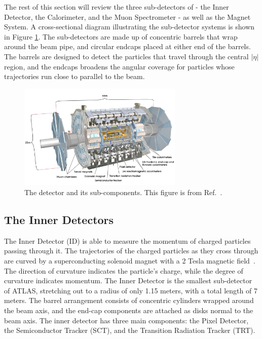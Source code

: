 The rest of this section will review the three sub-detectors of \ATLAS - the Inner Detector, the Calorimeter, and the Muon Spectrometer - as well as the Magnet System. A cross-sectional diagram illustrating the sub-detector systems is shown in Figure \ref{fig:atlasdetector}. The sub-detectors are made up of concentric barrels that wrap around the beam pipe, and circular endcaps placed at either end of the barrels. The barrels are designed to detect the particles that travel through the central $|\eta|$ region, and the endcaps broadens the angular coverage for particles whose trajectories run close to parallel to the beam. 



\begin{figure}[htb!]
    \centering
    \includegraphics[width=0.7\textwidth]{Figures/LHC/ATLASDetector.jpg}
    \caption{The \ATLAS detector and its sub-components. This figure is from Ref.~\cite{Reed:2014}.}
    \label{fig:atlasdetector}
\end{figure}

\subsection{The Inner Detectors} \label{ssec:ATLASID}
The Inner Detector (ID) is able to measure the momentum of charged particles passing through it. The trajectories of the charged particles as they cross through are curved by a superconducting solenoid magnet with a 2 Tesla magnetic field~\cite{Yamamoto:1999}. The direction of curvature indicates the particle's charge, while the degree of curvature indicates momentum. The Inner Detector is the smallest sub-detector of ATLAS, stretching out to a radius of only 1.15 meters, with a total length of 7 meters. The barrel arrangement consists of concentric cylinders wrapped around the beam axis, and the end-cap components are attached as disks normal to the beam axis. The inner detector has three main components: the Pixel Detector, the Semiconductor Tracker (SCT), and the Transition Radiation Tracker (TRT).

